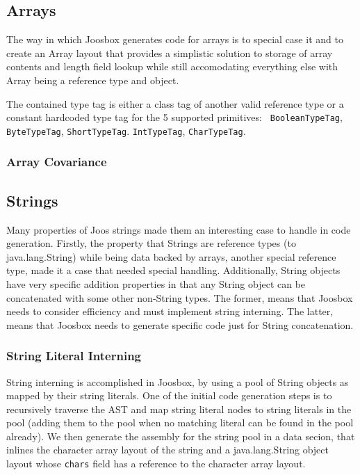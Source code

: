 \documentclass[letterpaper]{article}
\begin{document}
  \subsection{Arrays}

  The way in which Joosbox generates code for arrays is to special case it and
  to create an Array layout that provides a simplistic solution to storage of
  array contents and length field lookup while still accomodating everything
  else with Array being a reference type and object.


  The contained type tag is either a class tag of another valid reference type
  or a constant hardcoded type tag for the 5 supported primitives: {\tt
  BooleanTypeTag}, {\tt ByteTypeTag}, {\tt ShortTypeTag}. {\tt IntTypeTag},
  {\tt CharTypeTag}.

  \subsubsection{Array Covariance}

  \subsection{Strings}

  Many properties of Joos strings made them an interesting case to handle in
  code generation. Firstly, the property that Strings are reference types (to
  java.lang.String) while being data backed by arrays, another special reference
  type, made it a case that needed special handling. Additionally, String
  objects have very specific addition properties in that any String object can
  be concatenated with some other non-String types. The former, means that
  Joosbox needs to consider efficiency and must implement string interning. The
  latter, means that Joosbox needs to generate specific code just for String
  concatenation.

  \subsubsection{String Literal Interning}

  String interning is accomplished in Joosbox, by using a pool of String objects
  as mapped by their string literals. One of the initial code generation steps
  is to recursively traverse the AST and map string literal nodes to string
  literals in the pool (adding them to the pool when no matching literal can be
  found in the pool already). We then generate the assembly for the string pool
  in a data secion, that inlines the character array layout of the string and a
  java.lang.String object layout whose {\tt chars} field has a reference to the
  character array layout.
\end{document}
